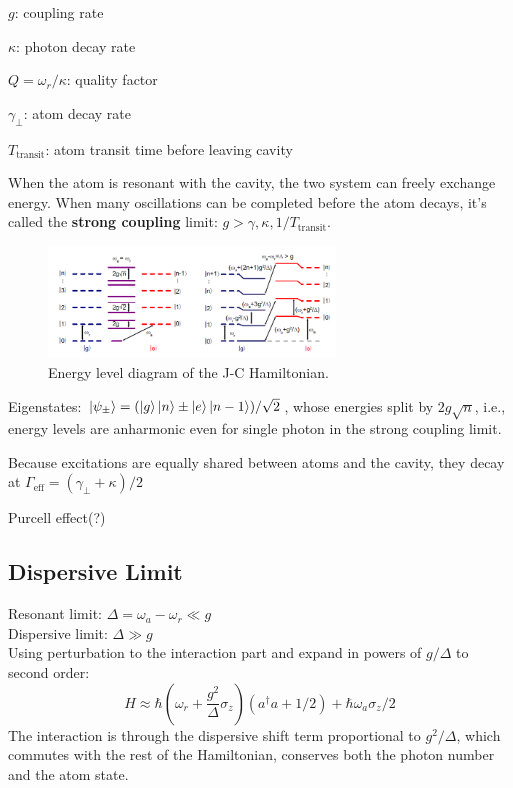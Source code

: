 \documentclass[8pt,a4paper,twocolumn]{article} %
\numberwithin{equation}{section} %
\begin{document}
		$g $: coupling rate

		$\kappa $: photon decay rate

		$ Q=\omega_r/\kappa $: quality factor

		$ \gamma_{\perp} $: atom decay rate

		$T_{\text{transit}}$: atom transit time before leaving cavity

		When the atom is resonant with the cavity, the two system can freely exchange energy. When many oscillations can be completed before the atom decays, it's called the \textbf{strong coupling} limit: $g>\gamma,\kappa,1/T_{\text{transit}} $.

		\begin{figure}[!h]
			\centering
			\includegraphics[width=3in]{JClevels.png}
			\caption{Energy level diagram of the J-C Hamiltonian. \cite{Schuster2007}}
			\label{pic:EnLevelOfJCH}
		\end{figure}

		Eigenstates: $ \ket{\psi_{\pm} } = ( \ket g \ket n \pm \ket e \ket{n-1} )/\sqrt 2 $, whose energies split by $2g\sqrt n$, i.e., energy levels are anharmonic even for single photon in the strong coupling limit.

		Because excitations are equally shared between atoms and the cavity, they decay at $\Gamma_{\text{eff} }=(\gamma_{\perp}+\kappa)/2 $

		Purcell effect(?)

		\subsection{Dispersive Limit} %
		\label{sub:dispersive_limit}
			Resonant limit: $\Delta=\omega_a- \omega_r \ll g $\\
			Dispersive limit: $\Delta\gg g$\\
			Using perturbation to the interaction part and expand in powers of $g/\Delta $ to second order:
			\begin{equation}
				H\approx \hbar \left( \omega_r +\frac{g^2}{\Delta} \sigma_z \right) (a^{\dagger}a+1/2)+\hbar \omega_a \sigma_z /2
			\end{equation}
			The interaction is through the dispersive shift term proportional to $g^2/\Delta$, which commutes with the rest of the Hamiltonian, conserves both the photon number and the atom state.
\end{document}
